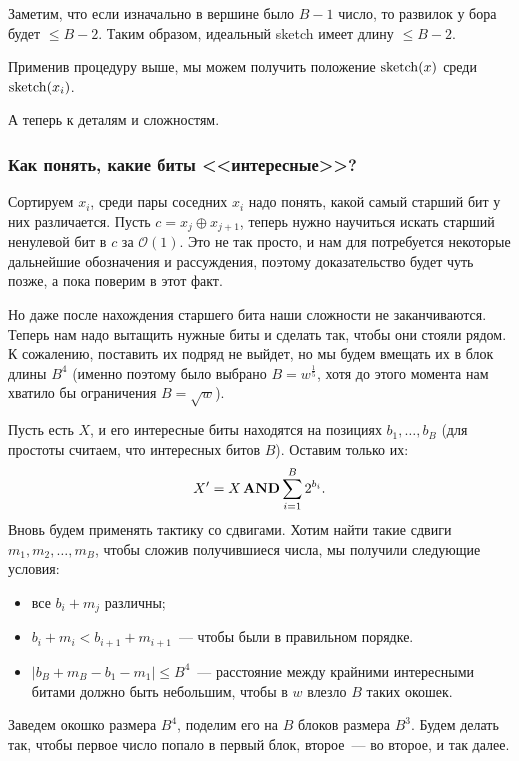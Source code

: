 Заметим, что если изначально в вершине было $B-1$ число, то развилок у бора будет $\leqslant B-2$. Таким образом, идеальный sketch имеет длину $\leqslant B-2$.

Применив процедуру выше, мы можем получить положение $\operatorname{sketch}(x)$ среди $\operatorname{sketch}(x_i)$. 

\smallskip

А теперь к деталям и сложностям.

\subsubsection{Как понять, какие биты <<интересные>>?}

Сортируем $x_i$, среди пары соседних $x_i$ надо понять, какой самый старший бит у них различается. Пусть $c = x_j \oplus x_{j+1}$, теперь нужно научиться искать старший ненулевой бит в $c$ за $\mathcal{O}(1)$. Это не так просто, и нам для потребуется некоторые дальнейшие обозначения и рассуждения, поэтому доказательство будет чуть позже, а пока поверим в этот факт.

\bigskip

Но даже после нахождения старшего бита наши сложности не заканчиваются. Теперь нам надо вытащить нужные биты и сделать так, чтобы они стояли рядом. К сожалению, поставить их подряд не выйдет, но мы будем вмещать их в блок длины $B^4$ (именно поэтому было выбрано $B = w^{\frac{1}{5}}$, хотя до этого момента нам хватило бы ограничения $B = \sqrt{w}$). 

Пусть есть $X$, и его интересные биты находятся на позициях $b_1, \ldots, b_B$ (для простоты считаем, что интересных битов $B$). Оставим только их: \[ X' = X \operatorname{\mathbf{AND}} \sum\limits_{i=1}^{B} 2^{b_i}. \] Вновь будем применять тактику со сдвигами. Хотим найти такие сдвиги $m_1, m_2, \ldots, m_B$, чтобы сложив получившиеся числа, мы получили следующие условия:

\begin{itemize}
    \item все $b_i+m_j$ различны;
    \item $b_i + m_i < b_{i+1} + m_{i+1}$~--- чтобы были в правильном порядке.
    \item $|b_B + m_B - b_1 - m_1| \leqslant B^4$~--- расстояние между крайними интересными битами должно быть небольшим, чтобы в $w$ влезло $B$ таких окошек.
\end{itemize}

Заведем окошко размера $B^4$, поделим его на $B$ блоков размера $B^3$. Будем делать так, чтобы первое число попало в первый блок, второе~--- во второе, и так далее.


